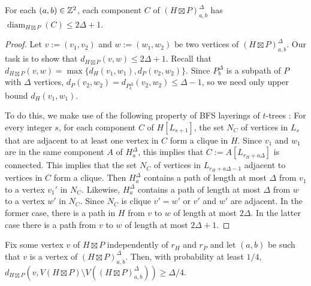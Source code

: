 \documentclass{patmorin}
\renewcommand{\ge}{\geqslant}
\renewcommand{\le}{\leqslant}
\newcommand{\david}[1]{{\color{orange} David: #1}}
\DeclareMathOperator{\diam}{diam}
\begin{document}

\begin{clm}\label{component_diameter}
  For each $(a,b)\in\mathbb{Z}^2$, each component $C$ of $(H\boxtimes P)^\Delta_{a,b}$ has $\diam_{H\boxtimes P}(C)\le 2\Delta+1$.
\end{clm}

\begin{proof}
  Let $v:=(v_1,v_2)$ and $w:=(w_1,w_2)$ be two vertices of $(H\boxtimes P)^\Delta_{a,b}$.  Our task is to show that $d_{H\boxtimes P}(v,w)\le 2\Delta+1$.  Recall that
  $d_{H\boxtimes P}(v,w)=\max\{d_{H}(v_1,w_1),d_{P}(v_2,w_2)\}$.  Since $P^\Delta_b$ is a subpath of $P$ with $\Delta$ vertices, $d_P(v_2,w_2)=d_{P^\Delta_b}(v_2,w_2)\le\Delta-1$, so we need only upper bound $d_{H}(v_1,w_1)$.

  To do this, we make use of the following property of BFS layerings of $t$-trees \cite{KP08,DMW05}:  For every integer $s$,
  for each component $C$ of $H[L_{s+1}]$,
    the set $N_C$ of vertices in $L_{s}$ that are adjacent to at least one vertex in $C$ form a clique in $H$.
  Since $v_1$ and $w_1$ are in the same component $A$ of $H^\Delta_a$, this implies that $C:=A[L_{r_H+a\Delta}]$ is connected.  This implies that the set $N_C$ of vertices in $L_{r_H+a\Delta-1}$ adjacent to vertices in $C$ form a clique.  Then $H^\Delta_a$ contains a path of length at most $\Delta$ from $v_1$ to a vertex $v_1'$ in $N_C$.   Likewise, $H^\Delta_a$ contains a path of length at most $\Delta$ from $w$ to a vertex $w'$ in $N_C$. Since $N_C$ is clique $v'=w'$ or $v'$ and $w'$ are adjacent.  In the former case, there is a path in $H$ from $v$ to $w$ of length at most $2\Delta$. In the latter case there is a path from $v$ to $w$ of length at most $2\Delta+1$.
\end{proof}

\begin{clm}\label{good_probability}
  Fix some vertex $v$ of $H\boxtimes P$ independently of $r_H$ and $r_P$ and let $(a,b)$ be such that $v$ is a vertex of $(H\boxtimes P)^\Delta_{a,b}$.  Then, with probability at least $1/4$,  $d_{H\boxtimes P}(v, V(H\boxtimes P)\setminus V((H\boxtimes P)^\Delta_{a,b})) \ge \Delta/4$.
\end{clm}
\end{document}
